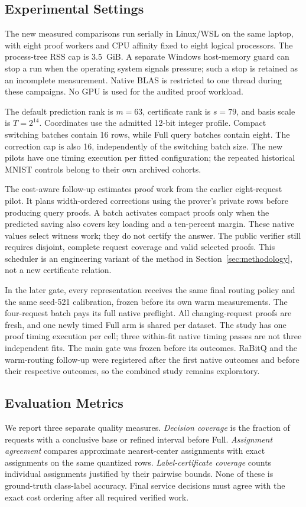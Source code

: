 \subsection{Experimental Settings}
\label{sec:ccd-settings}
The new measured comparisons run serially in Linux/WSL on the same laptop,
with eight proof workers and CPU affinity fixed to eight logical processors.
The process-tree RSS cap is 3.5~GiB. A separate Windows host-memory guard
can stop a run when the operating system signals pressure; such a stop is
retained as an incomplete measurement. Native BLAS is restricted to one
thread during these campaigns. No GPU is used for the audited proof workload.

The default prediction rank is $m=63$, certificate rank is $s=79$, and basis
scale is $T=2^{14}$. Coordinates use the admitted 12-bit integer profile.
Compact switching batches contain 16 rows, while Full query batches contain
eight. The correction cap is also 16, independently of the switching batch
size. The new pilots have one timing execution per fitted configuration;
the repeated historical MNIST controls belong to their own archived cohorts.

The cost-aware follow-up estimates proof work from the earlier eight-request
pilot. It plans width-ordered corrections using the prover's private rows
before producing query proofs. A batch activates compact proofs only when
the predicted saving also covers key loading and a ten-percent margin.
These native values select witness work; they do not certify the answer.
The public verifier still requires disjoint, complete request coverage and
valid selected proofs. This scheduler is an engineering variant of the
method in Section~\ref{sec:methodology}, not a new certificate relation.

In the later gate, every representation receives the same final routing
policy and the same seed-521 calibration, frozen before its own warm
measurements. The four-request batch pays its full native preflight.
All changing-request proofs are fresh, and one newly timed Full arm is
shared per dataset. The study has one proof timing execution per cell;
three within-fit native timing passes are not three independent fits.
The main gate was frozen before its outcomes. RaBitQ and the warm-routing
follow-up were registered after the first native outcomes and before
their respective outcomes, so the combined study remains exploratory.

\subsection{Evaluation Metrics}
\label{sec:ccd-metrics}
We report three separate quality measures. \emph{Decision coverage} is the
fraction of requests with a conclusive base or refined interval before Full.
\emph{Assignment agreement} compares approximate nearest-center assignments
with exact assignments on the same quantized rows. \emph{Label-certificate
coverage} counts individual assignments justified by their pairwise bounds.
None of these is ground-truth class-label accuracy. Final service decisions
must agree with the exact cost ordering after all required verified work.

